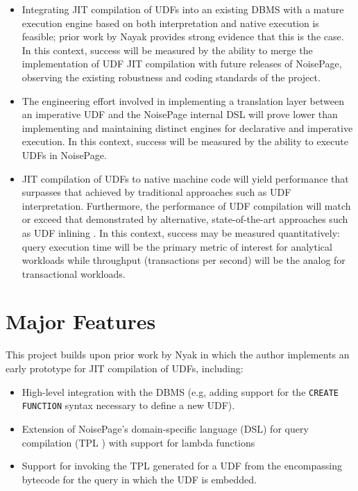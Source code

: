 \documentclass{vldb}
\def\code#1{\texttt{#1}}
\begin{document}
\begin{itemize}
    \item Integrating JIT compilation of UDFs into an existing DBMS with a mature execution engine based on both interpretation and native execution is feasible; prior work by Nayak \cite{tanuj} provides strong evidence that this is the case. In this context, success will be measured by the ability to merge the implementation of UDF JIT compilation with future releases of NoisePage, observing the existing robustness and coding standards of the project.
    \item The engineering effort involved in implementing a translation layer between an imperative UDF and the NoisePage internal DSL will prove lower than implementing and maintaining distinct engines for declarative and imperative execution. In this context, success will be measured by the ability to execute UDFs in NoisePage.
    \item JIT compilation of UDFs to native machine code will yield performance that surpasses that achieved by traditional approaches such as UDF interpretation. Furthermore, the performance of UDF compilation will match or exceed that demonstrated by alternative, state-of-the-art approaches such as UDF inlining \cite{apfel, froid, aggify}. In this context, success may be measured quantitatively: query execution time will be the primary metric of interest for analytical workloads while throughput (transactions per second) will be the analog for transactional workloads.
\end{itemize}


\section*{Major Features}

This project builds upon prior work by Nyak \cite{tanuj} in which the author implements an early prototype for JIT compilation of UDFs, including:

\begin{itemize}
    \item High-level integration with the DBMS (e.g, adding support for the \code{CREATE FUNCTION} syntax necessary to define a new UDF).
    \item Extension of NoisePage's domain-specific language (DSL) for query compilation (TPL \cite{pcq}) with support for lambda functions
    \item Support for invoking the TPL generated for a UDF from the encompassing bytecode for the query in which the UDF is embedded.
\end{itemize}
\end{document}
